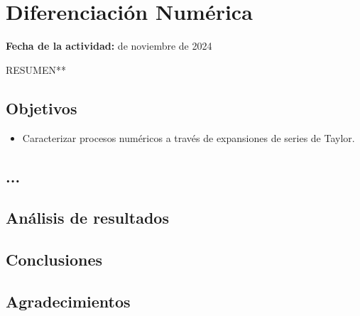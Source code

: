 \documentclass[../portafolio.tex]{subfiles}
\begin{document}
\chapter{Diferenciación Numérica}
\label{guia:2_derivadas_8}
\hfill \textbf{Fecha de la actividad:}  de noviembre de 2024

\medskip

RESUMEN**

\section{Objetivos}
\begin{itemize}
\item Caracterizar procesos numéricos a través de expansiones de series de Taylor.
\end{itemize}

\section{...}





\section{Análisis de resultados}

\section*{Conclusiones}

\section*{Agradecimientos}
\end{document}
